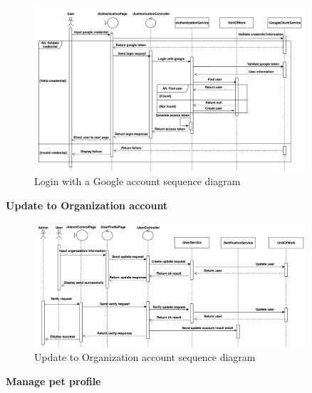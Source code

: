 \begin{figure}[H]
  \centering
  \includegraphics[width=0.9\textwidth]{Figures/login_gg_seq.png}
  \caption{Login with a Google account sequence diagram}
  \label{fig:login-google-seq}
\end{figure}

\textbf{Update to Organization account}

\begin{figure}[H]
  \centering
  \includegraphics[width=0.9\textwidth]{Figures/update_org_seq.png}
  \caption{Update to Organization account sequence diagram}
  \label{fig:update-org-seq}
\end{figure}

\textbf{Manage pet profile}

